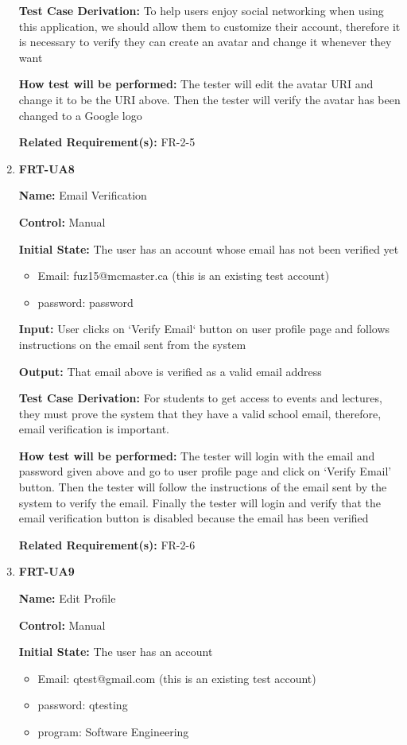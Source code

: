 \documentclass[12pt, titlepage]{article}
\begin{document}
\begin{enumerate}
\textbf{Test Case Derivation:} To help users enjoy social networking when using this application, we should allow them to customize their account, therefore it is necessary to verify they can create an avatar and change it whenever they want
					
\textbf{How test will be performed:} The tester will edit the avatar URI and change it to be the URI above. Then the tester will verify the avatar has been changed to a Google logo

\textbf{Related Requirement(s):} FR-2-5

\item{\textbf{FRT-UA8}}

\textbf{Name:} Email Verification

\textbf{Control:} Manual
					
\textbf{Initial State:} The user has an account whose email has not been verified yet
\begin{itemize}
\item Email: fuz15@mcmaster.ca (this is an existing test account)
\item password: password
\end{itemize}

\textbf{Input:} User clicks on `Verify Email` button on user profile page and follows instructions on the email sent from the system
					
\textbf{Output:} That email above is verified as a valid email address

\textbf{Test Case Derivation:} For students to get access to events and lectures, they must prove the system that they have a valid school email, therefore, email verification is important.
					
\textbf{How test will be performed:} The tester will login with the email and password given above and go to user profile page and click on `Verify Email' button. Then the tester will follow the instructions of the email sent by the system to verify the email. Finally the tester will login and verify that the email verification button is disabled because the email has been verified

\textbf{Related Requirement(s):} FR-2-6

\item{\textbf{FRT-UA9}}

\textbf{Name:} Edit Profile

\textbf{Control:} Manual
					
\textbf{Initial State:} The user has an account 
\begin{itemize}
\item Email: qtest@gmail.com (this is an existing test account)
\item password: qtesting
\item program: Software Engineering
\end{itemize}


\end{enumerate}
\end{document}
